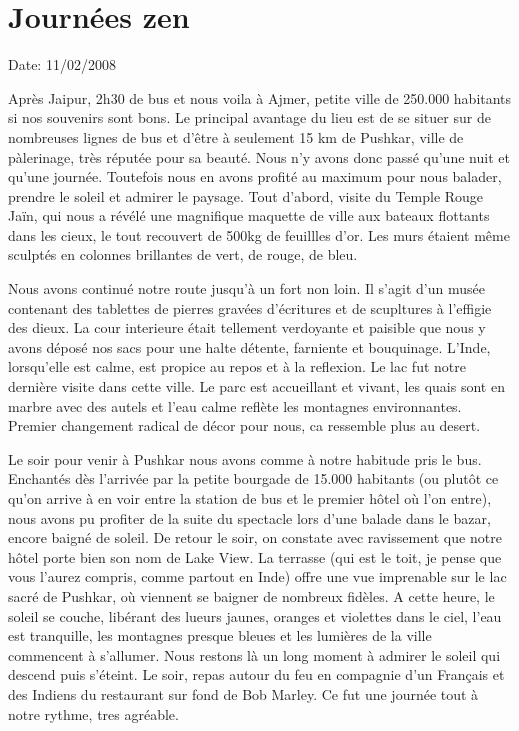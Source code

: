 \section{Journées zen}

Date: 11/02/2008

\begin{multicols}{2}

Après Jaipur, 2h30 de bus et nous voila à Ajmer, petite ville de 250.000 habitants si nos souvenirs sont bons. Le principal avantage du lieu est de se situer sur de nombreuses lignes de bus et d'être à seulement 15 km de Pushkar, ville de pàlerinage, très réputée pour sa beauté. Nous n'y avons donc passé qu'une nuit et qu'une journée. Toutefois nous en avons profité au maximum pour nous balader, prendre le soleil et admirer le paysage. Tout d'abord, visite du Temple Rouge Jaïn, qui nous a révélé une magnifique maquette de ville aux bateaux flottants dans les cieux, le tout recouvert de 500kg de feuillles d'or. Les murs étaient même sculptés en colonnes brillantes de vert, de rouge, de bleu.

Nous avons continué notre route jusqu'à un fort non loin. Il s'agit d'un musée contenant des tablettes de pierres gravées d'écritures et de scupltures à l'effigie des dieux. La cour interieure était tellement verdoyante et paisible que nous y avons déposé nos sacs pour une halte détente, farniente et bouquinage. L'Inde, lorsqu'elle est calme, est propice au repos et à la reflexion. Le lac fut notre dernière visite dans cette ville. Le parc est accueillant et vivant, les quais sont en marbre avec des autels et l'eau calme reflète les montagnes environnantes. Premier changement radical de décor pour nous, ca ressemble plus au desert.

Le soir pour venir à Pushkar nous avons comme à notre habitude pris le bus. Enchantés dès l'arrivée par la petite bourgade de 15.000 habitants (ou plutôt ce qu'on arrive à en voir entre la station de bus et le premier hôtel où l'on entre), nous avons pu profiter de la suite du spectacle lors d'une balade dans le bazar, encore baigné de soleil. De retour le soir, on constate avec ravissement que notre hôtel porte bien son nom de Lake View. La terrasse (qui est le toit, je pense que vous l'aurez compris, comme partout en Inde) offre une vue imprenable sur le lac sacré de Pushkar, où viennent se baigner de nombreux fidèles. A cette heure, le soleil se couche, libérant des lueurs jaunes, oranges et violettes dans le ciel, l'eau est tranquille, les montagnes presque bleues et les lumières de la ville commencent à s'allumer. Nous restons là un long moment à admirer le soleil qui descend puis s'éteint. Le soir, repas autour du feu en compagnie d'un Français et des Indiens du restaurant sur fond de Bob Marley. Ce fut une journée tout à notre rythme, tres agréable.


\end{multicols}
